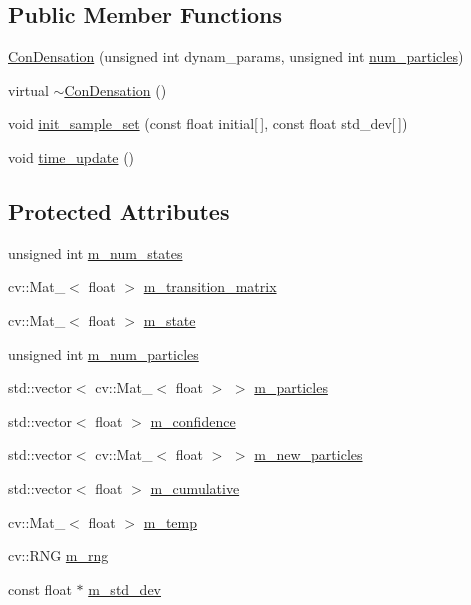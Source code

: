 \subsection*{Public Member Functions}
\begin{DoxyCompactItemize}
\item 
\hyperlink{classConDensation_a3c7e76ac520287c7eb12bf3b05ad5fa0}{ConDensation} (unsigned int dynam\_\-params, unsigned int \hyperlink{social__robot_8cpp_acf574bc864f7f0fc111320f1d6c449d5}{num\_\-particles})
\item 
virtual \hyperlink{classConDensation_aa8176dc480168102bdd41ea10b977878}{$\sim$ConDensation} ()
\item 
void \hyperlink{classConDensation_aa61120a09e253fe429ee6a912f856fd5}{init\_\-sample\_\-set} (const float initial\mbox{[}$\,$\mbox{]}, const float std\_\-dev\mbox{[}$\,$\mbox{]})
\item 
void \hyperlink{classConDensation_a5aef436b8879d0e97b4503b609678740}{time\_\-update} ()
\end{DoxyCompactItemize}
\subsection*{Protected Attributes}
\begin{DoxyCompactItemize}
\item 
unsigned int \hyperlink{classConDensation_a19d27b83f57f5704c920a2ce0276639f}{m\_\-num\_\-states}
\item 
cv::Mat\_\-$<$ float $>$ \hyperlink{classConDensation_a4aef4dc8a1246b56ca4996cddb4ddebf}{m\_\-transition\_\-matrix}
\item 
cv::Mat\_\-$<$ float $>$ \hyperlink{classConDensation_ae50f5310d9c2b5574a7fe502b78f2ca1}{m\_\-state}
\item 
unsigned int \hyperlink{classConDensation_a6dd623ea8aa0fda252df3676dec562be}{m\_\-num\_\-particles}
\item 
std::vector$<$ cv::Mat\_\-$<$ float $>$ $>$ \hyperlink{classConDensation_a0500c90957d129d1f17512aa0ec4f490}{m\_\-particles}
\item 
std::vector$<$ float $>$ \hyperlink{classConDensation_abc5be0956acb4bd5c6383c4e095aac86}{m\_\-confidence}
\item 
std::vector$<$ cv::Mat\_\-$<$ float $>$ $>$ \hyperlink{classConDensation_a489443034896778939e5e24741d42728}{m\_\-new\_\-particles}
\item 
std::vector$<$ float $>$ \hyperlink{classConDensation_a9062fce705b93a2ab93c114aa579943a}{m\_\-cumulative}
\item 
cv::Mat\_\-$<$ float $>$ \hyperlink{classConDensation_a3908e7f2187a4b0010fadff24b950130}{m\_\-temp}
\item 
cv::RNG \hyperlink{classConDensation_a3485c3841850db0017d06781fa7064cf}{m\_\-rng}
\item 
const float $\ast$ \hyperlink{classConDensation_ace037712799e93339a0146a5f2891e35}{m\_\-std\_\-dev}
\end{DoxyCompactItemize}


